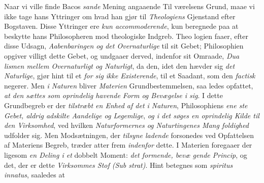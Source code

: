 Naar vi ville finde Bacos \emph{sande} Mening angaaende Til\-%
værelsens Grund, maae vi ikke tage hans Yttringer om hvad
han gjør til \emph{Theologiens} Gjenstand efter Bogstaven. Disse
Yttringer ere \emph{kun accommoderende}, kun beregnede paa at
beskytte hans Philosopheren mod theologiske Indgreb. Theo\-%
logien faaer, efter disse Udsagn, \emph{Aabenbaringen og det
Overnaturlige} til sit Gebet; Philosophien opgiver villigt
dette Gebet, og undgaaer derved, indenfor sit Omraade, \emph{Dua\-%
lismen mellem Overnaturligt og Naturligt}, da den,
idet den hævder sig \emph{det Naturlige}, gjør hint til et \emph{for sig}
 \setcounter{footnote}{0}
\emph{ikke Existerende}, til et Saadant, som den \emph{factisk} negerer.
Men \emph{i Naturen} bliver \emph{Materien} Grundbestemmelsen, saa\-%
ledes opfattet, \emph{at den sættes som oprindelig havende
Form og Bevægelse i sig}. I dette Grundbegreb er der
\emph{tilstræbt en Enhed af det i Naturen}, Philosophiens \emph{ene\-%
ste Gebet, aldrig adskilte Aandelige og Legemlige},
\emph{og i det søges en oprindelig Kilde til den Virksomhed},
ved hvilken \emph{Naturformernes og Naturtingenes Mang\-%
foldighed} udfolder sig. Men Modsætningen, der \emph{tilsyne\-%
ladende} forsonedes ved Opfattelsen af Materiens Begreb, træder
atter frem \emph{indenfor} dette. I Materien foregaaer der ligesom
\emph{en Deling i et} dobbelt Moment: \emph{det formende, bevæ\-%
gende Princip}, og det, der er dette \emph{Virksommes Stof (Sub\-%
strat)}. Hint betegnes som \emph{spiritus innatus}, saaledes at
